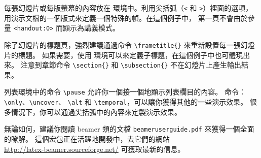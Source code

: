 每張幻燈片或每版螢幕的內容放在  環境中。利用尖括弧（\verb|<| 
和 \verb|>|）裡面的選項，用演示文檔的一個版式來定義一個特殊的幀。在這個例子中，
第一頁不會由於參量 \verb|<handout:0>| 而顯示為講義模式。


除了幻燈片的標題頁，強烈建議通過命令 \verb|\frametitle{}| 來重新設置每一張幻燈片的標題。
如果需要，使用  環境可以來定義子標題，在這個例子中也可體現出來。
注意到章節命令 \verb|\section{}| 和 \verb|\subsection{}| 不在幻燈片上產生輸出結果。


列表環境中的命令 \verb|\pause| 允許你一個接一個地顯示列表欄目的內容。
命令：\verb|\only|、\verb|\uncover|、
\verb|\alt| 和 \verb|\temporal|，可以讓你獲得其他的一些演示效果。
很多情況下，你可以通過尖括弧中的內容來定製演示效果。


無論如何，建議你閱讀 beamer 類的文檔 \texttt{beameruserguide.pdf} 來獲得一個全面的瞭解。
這個宏包正在活躍地開發中，去它們的網站\\
\href{http://latex-beamer.sourceforge.net/}{http://latex-beamer.sourceforge.net/}
可獲取最新的信息。


